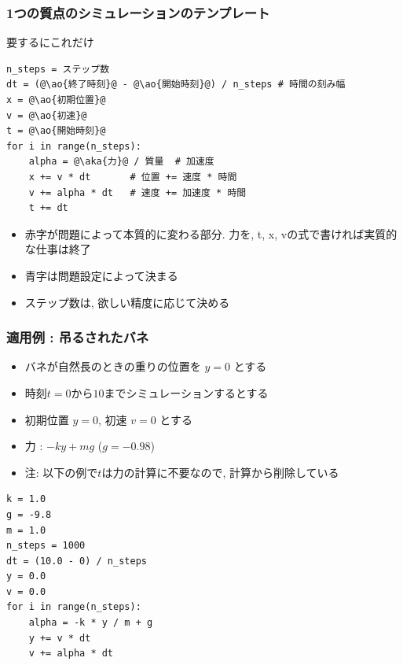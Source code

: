 \documentclass[10pt,dvipdfmx]{beamer}
\newcommand{\ao}[1]{{\color{blue}#1}}
\newcommand{\aka}[1]{{\color{red}#1}}
\begin{document}
\begin{frame}[fragile]
\frametitle{1つの質点のシミュレーションのテンプレート}
要するにこれだけ

\begin{lstlisting}
n_steps = ステップ数
dt = (@\ao{終了時刻}@ - @\ao{開始時刻}@) / n_steps # 時間の刻み幅
x = @\ao{初期位置}@
v = @\ao{初速}@
t = @\ao{開始時刻}@
for i in range(n_steps):
    alpha = @\aka{力}@ / 質量  # 加速度
    x += v * dt       # 位置 += 速度 * 時間
    v += alpha * dt   # 速度 += 加速度 * 時間
    t += dt
\end{lstlisting}

\begin{itemize}
\item \aka{赤字}が問題によって本質的に変わる部分.
\aka{力}を, t, x, vの式で書ければ実質的な仕事は終了
\item \ao{青字}は問題設定によって決まる
\item ステップ数は, 欲しい精度に応じて決める
\end{itemize}
\end{frame}


\begin{frame}[fragile]
\frametitle{適用例 : 吊るされたバネ}
\begin{itemize}
\item バネが自然長のときの重りの位置を $y = 0$ とする
\item 時刻$t = 0$から$10$までシミュレーションするとする
\item 初期位置 $y = 0$, 初速 $v = 0$ とする
\item \aka{力} : $-ky + mg$  ($g=-0.98$)
\item 注: 以下の例で$t$は力の計算に不要なので,
  計算から削除している
\end{itemize}

\begin{lstlisting}
k = 1.0
g = -9.8
m = 1.0
n_steps = 1000
dt = (10.0 - 0) / n_steps 
y = 0.0
v = 0.0
for i in range(n_steps):
    alpha = -k * y / m + g
    y += v * dt
    v += alpha * dt
\end{lstlisting}

\end{frame}


\end{document}

